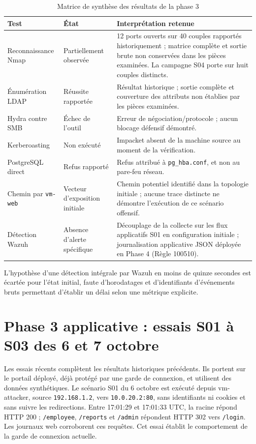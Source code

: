 \documentclass[a4paper,12pt]{report}
\begin{document}
\begin{table}[H]
\centering
\caption{Matrice de synthèse des résultats de la phase 3}
\label{tab:phase3-results}
\small
\begin{tabularx}{\textwidth}{@{}p{3.2cm}p{2.7cm}X@{}}
\toprule
\textbf{Test} & \textbf{État} & \textbf{Interprétation retenue} \\
\midrule
Reconnaissance Nmap & Partiellement observée & 12 ports ouverts sur 40 couples rapportés historiquement ; matrice complète et sortie brute non conservées dans les pièces examinées. La campagne S04 porte sur huit couples distincts. \\
Énumération LDAP & Réussite rapportée & Résultat historique ; sortie complète et couverture des attributs non établies par les pièces examinées. \\
Hydra contre SMB & Échec de l'outil & Erreur de négociation/protocole ; aucun blocage défensif démontré. \\
Kerberoasting & Non exécuté & Impacket absent de la machine source au moment de la vérification. \\
PostgreSQL direct & Refus rapporté & Refus attribué à \texttt{pg\_hba.conf}, et non au pare-feu réseau. \\
Chemin par \texttt{vm-web} & Vecteur d'exposition initiale & Chemin potentiel identifié dans la topologie initiale ; aucune trace distincte ne démontre l'exécution de ce scénario offensif. \\
Détection Wazuh & Absence d'alerte spécifique & Découplage de la collecte sur les flux applicatifs S01 en configuration initiale ; journalisation applicative JSON déployée en Phase 4 (Règle 100510). \\
\bottomrule
\end{tabularx}
\end{table}

L'hypothèse d'une détection intégrale par Wazuh en moins de quinze secondes est écartée pour l'état initial, faute d'horodatages et d'identifiants d'événements bruts permettant d'établir un délai selon une métrique explicite.
\section{Phase 3 applicative : essais S01 à S03 des 6 et 7 octobre}
Les essais récents complètent les résultats historiques précédents. Ils portent sur le portail déployé, déjà protégé par une garde de connexion, et utilisent des données synthétiques. Le scénario S01 du 6 octobre est exécuté depuis vm-attacker, source \texttt{192.168.1.2}, vers \texttt{10.0.20.2:80}, sans identifiants ni cookies et sans suivre les redirections. Entre 17:01:29 et 17:01:33 UTC, la racine répond HTTP 200 ; \texttt{/employee}, \texttt{/reports} et \texttt{/admin} répondent HTTP 302 vers \texttt{/login}. Les journaux web corroborent ces requêtes. Cet essai établit le comportement de la garde de connexion actuelle.
\end{document}
